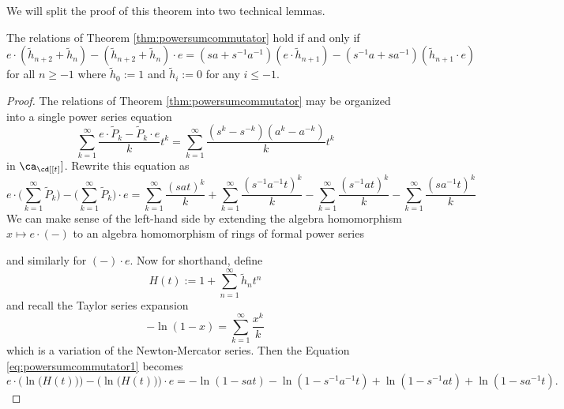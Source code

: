 We will split the proof of this theorem into two technical lemmas.

\begin{lemma} \label{lem:powersumcommutator1}
The relations of Theorem \ref{thm:powersumcommutator} hold if and only if 
\begin{equation} 
e \cdot (\tilde{h}_{n+2} + \tilde{h}_n) - (\tilde{h}_{n+2} + \tilde{h}_n) \cdot e = (sa + s^{-1}a^{-1}) (e \cdot \tilde{h}_{n+1}) - (s^{-1}a + sa^{-1}) (\tilde{h}_{n+1} \cdot e)
\end{equation}
for all $n \geq -1$ where $\tilde{h}_0 := 1$ and $\tilde{h}_{i} := 0$ for any $i \leq -1$. 
\end{lemma}
\begin{proof}
The relations of Theorem \ref{thm:powersumcommutator} may be organized into a single power series equation
\begin{equation} \label{eq:powersumcommutator1}
\sum_{k=1}^\infty \frac{e \cdot \tilde{P}_k - \tilde{P}_k \cdot e}{k} t^k = \sum_{k=1}^{\infty} \frac {(s^k - s^{-k}) (a^k - a^{-k})}{k} t^k
\end{equation}
in $\ca_\cd [[t]]$. Rewrite this equation as
\begin{equation} \label{eq:powersumcommutator2} 
e \cdot \Bigg( \sum_{k=1}^\infty \tilde{P}_k \Bigg) - \Bigg( \sum_{k=1}^\infty \tilde{P}_k \Bigg) \cdot e = \sum_{k=1}^{\infty} \frac {(sat)^k}{k} + \sum_{k=1}^{\infty} \frac {(s^{-1}a^{-1}t)^k}{k} - \sum_{k=1}^{\infty} \frac {(s^{-1}at)^k}{k} - \sum_{k=1}^{\infty} \frac {(sa^{-1}t)^k}{k}
\end{equation}
We can make sense of the left-hand side by extending the algebra homomorphism $x \mapsto e \cdot (-)$ to an algebra homomorphism of rings of formal power series
\begin{center}
\end{center}
and similarly for $(-) \cdot e$. Now for shorthand, define 
\[
H(t) := 1 + \sum_{n=1}^\infty \tilde{h}_n t^n
\]
and recall the Taylor series expansion
\[
-\ln(1-x) = \sum_{k=1}^\infty \frac{x^k}{k}
\]
which is a variation of the Newton-Mercator series. Then the Equation \eqref{eq:powersumcommutator1} becomes
\begin{equation} \label{eq:powersumcommutator3} 
e \cdot \Big( \ln\big(H(t)\big) \Big) - \big( \ln \big(H(t)\big) \Big) \cdot e = - \ln(1 - sat) - \ln(1 - s^{-1}a^{-1}t) + \ln(1 - s^{-1}at) + \ln(1 - sa^{-1}t).

\end{equation}
\end{proof}
